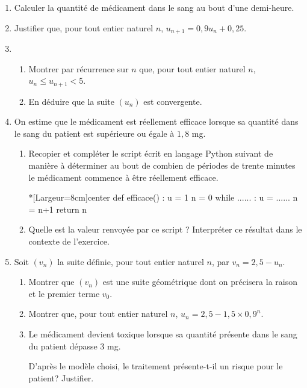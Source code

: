 \begin{enumerate}
	\item Calculer la quantité de médicament dans le sang au bout d'une demi-heure.
	\item Justifier que, pour tout entier naturel $n$, $u_{n+1} = 0,9u_n + 0,25$.
	\item 
	\begin{enumerate}
		\item Montrer par récurrence sur $n$ que, pour tout entier naturel $n$, $u_n \leqslant  u_{n+1} < 5$.
		\item En déduire que la suite $\left(u_n\right)$ est convergente.
	\end{enumerate}
	\item On estime que le médicament est réellement efficace lorsque sa quantité dans le sang du patient est supérieure ou égale à $1,8$ mg.
	\begin{enumerate}
		\item Recopier et compléter le script écrit en langage \textsf{Python} suivant de manière à déterminer au bout de combien de périodes de trente minutes le médicament commence à être réellement efficace.
		
\begin{CodePythonLstAlt}*[Largeur=8cm]{center}
def efficace() :
	u = 1
	n = 0
	while ...... :
		u = ......
		n = n+1
	return n
\end{CodePythonLstAlt}
		\item Quelle est la valeur renvoyée par ce script ? Interpréter ce résultat dans le contexte de l'exercice.
	\end{enumerate}
	\item Soit $\left(v_n\right)$ la suite définie, pour tout entier naturel $n$, par $v_n = 2,5 - u_n$.
	\begin{enumerate}
		\item Montrer que $\left(v_n\right)$ est une suite géométrique dont on précisera la raison et le premier terme $v_0$.
		\item Montrer que, pour tout entier naturel $n$, $u_n = 2,5 - 1,5 \times 0,9^n$.
		\item Le médicament devient toxique lorsque sa quantité présente dans le sang du patient dépasse $3$ mg. 
		
		D'après le modèle choisi, le traitement présente-t-il un risque pour le patient? Justifier.
	\end{enumerate}
\end{enumerate}

